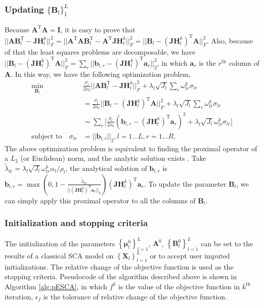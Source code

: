\subsubsection*{Updating $\{ \mathbf{B}_l \}_{1}^{L}$}
Because $\mathbf{A}^{\text{T}}\mathbf{A} = \mathbf{I}$, it is easy to prove that $||\mathbf{AB}_l^{\text{T}} - \mathbf{JH}_{l}^{k}||_F^2 = ||\mathbf{A}^{\text{T}}\mathbf{AB}_l^{\text{T}} - \mathbf{A}^{\text{T}}\mathbf{JH}_{l}^{k}||_F^2 = ||\mathbf{B}_l - (\mathbf{JH}_{l}^{k})^{\text{T}} \mathbf{A}||_F^2$. Also, because of that the least squares problems are decomposable, we have $||\mathbf{B}_l - (\mathbf{JH}_{l}^{k})^{\text{T}} \mathbf{A}||_F^2 = \sum_{r} ||\mathbf{b}_{l,r} - (\mathbf{JH}_{l}^{k})^{\text{T}} \mathbf{a}_r||_2^2$, in which $\mathbf{a}_r$ is the $r^{\text{th}}$ column of $\mathbf{A}$. In this way, we have the following optimization problem,
\begin{equation}\label{chapter5_eq:7}
\begin{aligned}
    \min_{\mathbf{B}_l} \quad & \frac{\rho_l}{2\alpha_l} ||\mathbf{AB}_l^{\text{T}} - \mathbf{JH}_{l}^{k}||_F^2  + \lambda_l \sqrt{J_l} \sum_{r} \omega_{lr}^k \sigma_{lr} \\
	&= \frac{\rho_l}{2\alpha_l}||\mathbf{B}_l - (\mathbf{JH}_{l}^{k})^{\text{T}} \mathbf{A}||_F^2 + \lambda_l \sqrt{J_l} \sum_{r} \omega_{lr}^k \sigma_{lr}\\
    &= \sum_{r} \Big[ \frac{\rho_l}{2\alpha_l}(\mathbf{b}_{l,r} - (\mathbf{JH}_{l}^{k})^{\text{T}} \mathbf{a}_r)^2 + \lambda_l \sqrt{J_l}\omega_{lr}^k \sigma_{lr} \Big]\\
    \text{subject to} \quad \sigma_{lr} &= ||\mathbf{b}_{l,r}||_2, l = 1 \ldots L, r = 1 \ldots R,
\end{aligned}
\end{equation}
The above optimization problem is equivalent to finding the proximal operator of a $L_2$ (or Euclidean) norm, and the analytic solution exists \cite{parikh2014proximal}. Take $\tilde{\lambda}_{lr} = \lambda_l \sqrt{J_l} \omega_{lr}^k \alpha_l/\rho_l$, the analytical solution of $\mathbf{b}_{l,r}$ is $\mathbf{b}_{l,r} = \max(0, 1- \frac{\tilde{\lambda}_{lr}}{||(\mathbf{JH}_{l}^{k})^{\text{T}} \mathbf{a}_r||_2}) (\mathbf{JH}_{l}^{k})^{\text{T}} \mathbf{a}_r$. To update the parameter $\mathbf{B}_l$, we can simply apply this proximal operator to all the columns of $\mathbf{B}_l$.

\subsubsection*{Initialization and stopping criteria}
The initialization of the parameters $\left\{\bm{\mu}_l^0\right\}_{l=1}^{L}$, $\mathbf{A}^0$, $\left\{\mathbf{B}_l^0\right\}_{l=1}^{L}$ can be set to the results of a classical SCA model on $\left\{\mathbf{X}_l\right\}_{l=1}^{L}$ or to accept user imputed initializations. The relative change of the objective function is used as the stopping criteria. Pseudocode of the algorithm described above is shown in Algorithm \ref{alg:pESCA}, in which $f^k$ is the value of the objective function in $k^{\text{th}}$ iteration, $\epsilon_f$ is the tolerance of relative change of the objective function.

